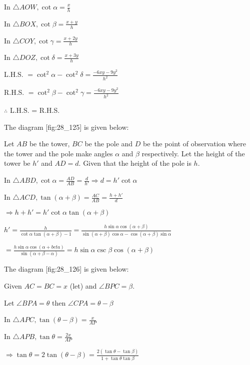   In $\triangle AOW, \cot\alpha = \frac{x}{h}$

  In $\triangle BOX, \cot\beta = \frac{x + y}{h}$

  In $\triangle COY, \cot\gamma = \frac{x + 2y}{h}$

  In $\triangle DOZ, \cot\delta = \frac{x + 3y}{h}$

  L.H.S. $= \cot^2\alpha - \cot^2\delta = \frac{-6xy - 9y^2}{h^2}$

  R.H.S. $= \cot^2\beta - \cot^2\gamma = \frac{-6xy - 9y^2}{h^2}$

  $\therefore$ L.H.S. = R.H.S.

\item The diagram [fig:28_125] is given below:

  \startplacefigure[reference=fig:28_125]
    \externalfigure[28_125.pdf]
  \stopplacefigure

  Let $AB$ be the tower, $BC$ be the pole and $D$ be the point of observation where the
  tower and the pole make angles $\alpha$ and $\beta$ respectively. Let the height of the
  tower be $h'$ and $AD = d$. Given that the height of the pole is $h$.

  In $\triangle ABD, \cot\alpha = \frac{AD}{AB} = \frac{d}{h'} \Rightarrow d = h'\cot\alpha$

  In $\triangle ACD, \tan(\alpha + \beta) = \frac{AC}{AB} = \frac{h + h'}{d}$

  $\Rightarrow h + h' = h'\cot\alpha\tan(\alpha + \beta)$

  $h' = \frac{h}{\cot\alpha\tan(\alpha + \beta) - 1} = \frac{h\sin\alpha\cos(\alpha +
    \beta)}{\sin(\alpha + \beta)\cos\alpha - \cos(\alpha + \beta)\sin\alpha}$

  $= \frac{h\sin\alpha\cos(\alpha + beta)}{\sin(\alpha + \beta - \alpha)} =
  h\sin\alpha\csc\beta\cos(\alpha + \beta)$

\item The diagram [fig:28_126] is given below:

  \startplacefigure[reference=fig:28_126]
    \externalfigure[28_126.pdf]
  \stopplacefigure

  Given $AC = BC = x$ (let) and $\angle BPC = \beta$.

  Let $\angle BPA = \theta$ then $\angle CPA = \theta - \beta$

  In $\triangle APC, \tan(\theta - \beta) = \frac{x}{AP}$

  In $\triangle APB, \tan\theta = \frac{2x}{AP}$

  $\Rightarrow \tan\theta = 2\tan(\theta - \beta) = \frac{2(\tan\theta - \tan\beta)}{1 +
    \tan\theta\tan\beta}$

